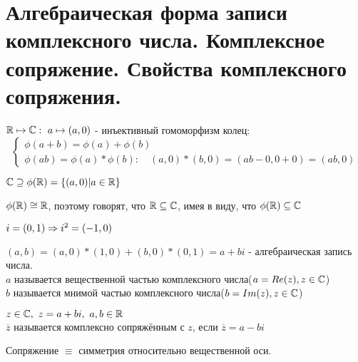\section{Алгебраическая форма записи комплексного числа. Комплексное сопряжение.
Свойства комплексного сопряжения.}

$\mathbb{R} \mapsto \mathbb{C}:~a \mapsto (a, 0)$ - инъективный гомоморфизм колец: \\
$$
\begin{cases}
	\phi(a+b) = \phi(a) + \phi(b) \\
	\phi(ab) = \phi(a) * \phi(b):\quad(a, 0)*(b, 0) = (ab - 0, 0 + 0) = (ab, 0)
\end{cases}
$$

$\mathbb{C} \supseteq \phi(\mathbb{R}) = \{(a, 0) | a \in \mathbb{R}\}$

$\phi(\mathbb{R}) \cong \mathbb{R}$, поэтому говорят, что $\mathbb{R} \subseteq \mathbb{C}$, имея в виду, что $\phi(\mathbb{R}) \subseteq \mathbb{C}$

$i = (0, 1) \Rightarrow i^2 = (-1, 0)$
\begin{Def}
	$(a, b) = (a, 0)*(1, 0) + (b, 0)*(0, 1) = a + bi$ - алгебраическая запись числа.\\
	\hspace*{1cm}$a$ называется вещественной частью комплексного числа($a = Re(z), z \in \mathbb{C}$) \\
	\hspace*{1cm}$b$ называется мнимой частью комплексного числа($b = Im(z), z \in \mathbb{C}$) 
\end{Def}  

\begin{Def}
	$z \in \mathbb{C},~z = a + bi,~a, b \in \mathbb{R}$ \\
	\hspace*{1cm} $\overline{z}$ называется комплексно сопряжённым с $z$, если $\overline{z} = a - bi$ 
\end{Def}
\begin{Rem}
	Сопряжение $\equiv$ симметрия относительно вещественной оси. \\
\begin{center}
\def\svgwidth{6.0cm}

\end{center}
\end{Rem}

